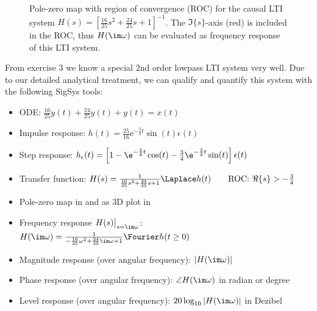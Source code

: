\begin{figure}
\centering
{}
\caption{Pole-zero map with region of convergence (ROC) for the causal LTI system
$H(s) = \left[\frac{16}{25} s^2 + \frac{24}{25} s + 1\right]^{-1}$.
The $\Im\{s\}$-axis (red) is included in the ROC, thus $H(\im\omega)$ can be evaluated as
frequency response of this LTI system.}
\label{fig:pzmap_44EB4169E9}
\end{figure}



From exercise 3 we know a special 2nd order lowpass LTI system very well.
Due to our detailed analytical treatment, we can qualify and quantify this system
with the following SigSys tools:
\begin{itemize}
  \item ODE: $\frac{16}{25} \ddot{y}(t) + \frac{24}{25} \dot{y}(t) + y(t) = x(t)$
  \item Impulse response: $h(t) = \frac{25}{16} \mathrm{e}^{-\frac{3}{4} t} \sin(t) \epsilon(t)$
  \item Step response: $h_\epsilon(t)=\left[1
  - \e^{-\frac{3}{4} t} \cos(t)
  - \frac{3}{4}\e^{-\frac{3}{4} t} \sin(t) \right]\epsilon(t)$
  \item Transfer function:
  $H(s) = \frac{1}{\frac{16}{25} s^2 + \frac{24}{25} s + 1}\Laplace h(t)
  \qquad\text{ROC: }\Re\{s\}>-\frac{3}{4}$
  \item Pole-zero map in  and as 3D plot in
  \item Frequency response $H(s)\big|_{s=\im\omega}$:
  $H(\im\omega) = \frac{1}{-\frac{16}{25}\omega^2 + \frac{24}{25}\im\omega  + 1}
  \Fourier h(t \geq 0)$
  \item Magnitude response (over angular frequency): $|H(\im\omega)|$
  \item Phase response (over angular frequency): $\angle H(\im\omega)$ in radian or degree
  \item Level response (over angular frequency): $20 \log_{10}|H(\im\omega)|$ in Dezibel
\end{itemize}

